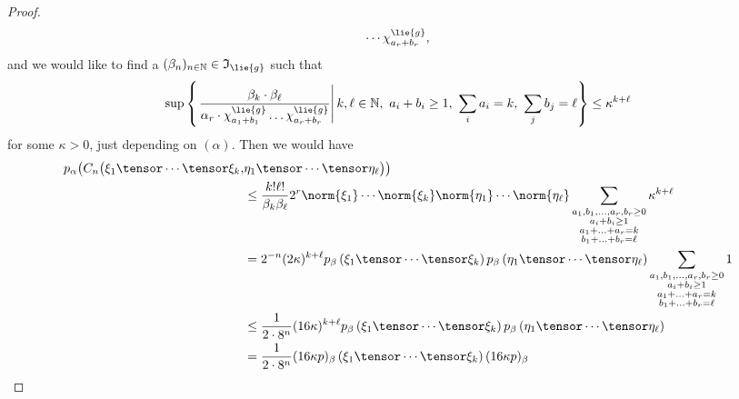 \begin{proof}
\begin{equation*}
{       		\cdots
       		\chi^{\lie{g}}_{a_r + b_r}
       	},
	\end{equation*}
	and we would like to find a $(\beta_n)_{n \in \mathbb{N}} \in 
	\mathfrak{I}_{\lie{g}}$ such that
	\begin{equation}
		\label{Nilpot:SavingSequence}
		\sup
		\left\{
		\left.
			\frac{\beta_k \cdot \beta_{\ell}}
	       	{
	       		\alpha_r
	       		\cdot
	       		\chi^{\lie{g}}_{a_1 + b_1}
	       		\ldots
	       		\chi^{\lie{g}}_{a_r + b_r}
	       	}
	    \right|
	    		k, \ell \in \mathbb{N},\
	    		a_i + b_i \geq 1,\
        		\sum_i a_i = k,\
        		\sum_j b_j = \ell
		\right\}
		\leq
		\kappa^{k + \ell}
	\end{equation}
	for some $\kappa > 0$, just depending on $(\alpha)$. Then we would have
	\begin{align*}
		p_{\alpha} \big(
			C_n \big( 
			\xi_1 \tensor \cdots \tensor \xi_k,
		&
			\eta_1 \tensor \cdots \tensor \eta_\ell 
			\big)
		\big)
		\\
		& \leq
    	\frac{k! \ell!}{\beta_k \beta_{\ell}} 
    	2^r
       	\norm{\xi_1} \cdots \norm{\xi_k}
       	\norm{\eta_1} \cdots \norm{\eta_\ell}
    		\sum\limits_{\substack{a_1, b_1, \ldots, a_r, b_r \geq 0 \\
        		a_i + b_i \geq 1 \\
        		a_1 + \ldots + a_r = k \\
        		b_1 + \ldots + b_r = \ell
       	}}
       	\kappa^{k + \ell}
       	\\
       	& =
       	2^{-n}
       	(2 \kappa)^{k + \ell}
       	p_{\beta}
       	\left( \xi_1 \tensor \cdots \tensor \xi_k \right)
       	p_{\beta}
       	\left( \eta_1 \tensor \cdots \tensor \eta_\ell \right)
       	\sum\limits_{\substack{a_1, b_1, \ldots, a_r, b_r \geq 0 \\
        		a_i + b_i \geq 1 \\
        		a_1 + \ldots + a_r = k \\
        		b_1 + \ldots + b_r = \ell
       	}}
       	1
       	\\
       	& \leq
       	\frac{1}{2 \cdot 8^n} 
       	(16 \kappa)^{k + \ell}
       	p_{\beta}
       	\left( \xi_1 \tensor \cdots \tensor \xi_k \right)
       	p_{\beta}
       	\left( \eta_1 \tensor \cdots \tensor \eta_\ell  \right)
       	\\ 
       	& =
       	\frac{1}{2 \cdot 8^n} 
       	(16 \kappa p)_{\beta}
       	\left( \xi_1 \tensor \cdots \tensor \xi_k \right)
       	(16 \kappa p)_{\beta}

\end{align*}
\end{proof}
